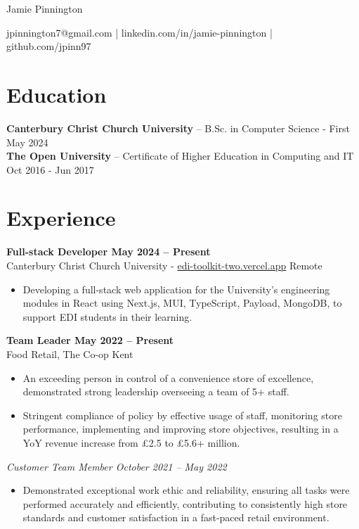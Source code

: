 \documentclass[11pt,letterpaper]{article}
\begin{document}
\centering
\centerline{\Huge Jamie Pinnington}
\vspace{6pt}
\centerline{jpinnington7@gmail.com | linkedin.com/in/jamie-pinnington | github.com/jpinn97}

\section*{Education}
\textbf{Canterbury Christ Church University} -- B.Sc. in Computer Science - First \hfill May 2024 \\
\textbf{The Open University} -- Certificate of Higher Education in Computing and IT \hfill Oct 2016 - Jun 2017

\vspace{-4.5pt}

\section*{Experience}

\textbf{Full-stack Developer \hfill May 2024 -- Present}\\
Canterbury Christ Church University - \href{https://edi-toolkit-two.vercel.app}{edi-toolkit-two.vercel.app} \hfill Remote \\
\vspace{-10pt}
\begin{itemize}
  \item Developing a full-stack web application for the University's engineering modules in React using Next.js, MUI, TypeScript, Payload, MongoDB, to support EDI students in their learning.
\end{itemize}

\textbf{Team Leader \hfill May 2022 -- Present}\\
Food Retail, The Co-op \hfill Kent \\
\vspace{-10pt}
\begin{itemize}
  \item An exceeding person in control of a convenience store of excellence, demonstrated strong leadership overseeing a team of 5+ staff.
  \item Stringent compliance of policy by effective usage of staff, monitoring store performance, implementing and improving store objectives, resulting in a YoY revenue increase from £2.5 to £5.6+ million.
\end{itemize}

\textit{Customer Team Member \hfill October 2021 -- May 2022}\\
\vspace{-10pt}
\begin{itemize}
  \item Demonstrated exceptional work ethic and reliability, ensuring all tasks were performed accurately and efficiently, contributing to consistently high store standards and customer satisfaction in a fast-paced retail environment.
\end{itemize}
\end{document}
